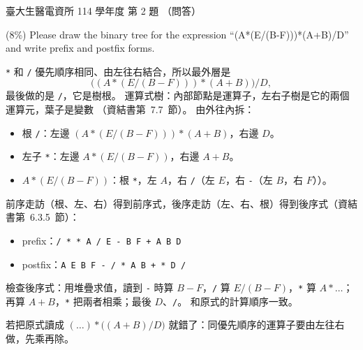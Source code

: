 \begin{pastexam}[label={px:ntu-114-bmei-ca-02}]{臺大生醫電資所 114 學年度 第 2 題}
（問答）

(8\%) Please draw the binary tree for the expression ``(A*(E/(B-F)))*(A+B)/D'' and write prefix and postfix forms.
\end{pastexam}

\begin{pastsoln}
\texttt{*} 和 \texttt{/} 優先順序相同、由左往右結合，所以最外層是
\[
\big((A * (E / (B - F))) * (A + B)\big) / D,
\]
最後做的是 \texttt{/}，它是樹根。 運算式樹：內部節點是運算子，左右子樹是它的兩個運算元，葉子是變數
（資結書第~7.7~節）。 由外往內拆：
\begin{itemize}
\item 根 \texttt{/}：左邊 $(A * (E/(B-F))) * (A + B)$，右邊 $D$。
\item 左子 \texttt{*}：左邊 $A * (E/(B-F))$，右邊 $A + B$。
\item $A * (E/(B-F))$：根 \texttt{*}，左 $A$，右 \texttt{/}（左 $E$，右 \texttt{-}（左 $B$，右 $F$））。
\end{itemize}
\begin{center}
\end{center}
前序走訪（根、左、右）得到前序式，後序走訪（左、右、根）得到後序式（資結書第~6.3.5~節）：
\begin{itemize}
\item prefix：\texttt{/ * * A / E - B F + A B D}
\item postfix：\texttt{A E B F - / * A B + * D /}
\end{itemize}
檢查後序式：用堆疊求值，讀到 \texttt{-} 時算 $B - F$，\texttt{/} 算 $E/(B-F)$，\texttt{*} 算 $A * \ldots$；
再算 $A + B$，\texttt{*} 把兩者相乘；最後 $D$、\texttt{/}。 和原式的計算順序一致。

若把原式讀成 $(\ldots) * \big((A + B)/D\big)$ 就錯了：同優先順序的運算子要由左往右做，先乘再除。
\end{pastsoln}
